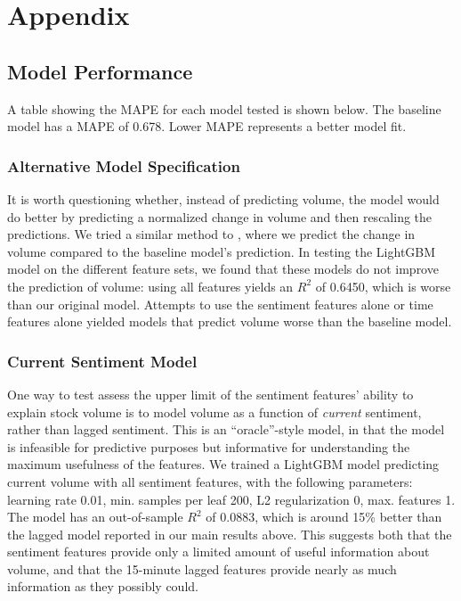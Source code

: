 \documentclass[12pt]{article}
\begin{document}
\newpage
\printbibliography
\newpage

\section{Appendix}
\subsection{Model Performance}
\label{section:appendix_model_performance}
A table showing the MAPE for each model tested is shown below. The baseline model has a MAPE of 0.678. Lower MAPE represents a better model fit.


\subsubsection{Alternative Model Specification}
It is worth questioning whether, instead of predicting volume, the model would do better by predicting a normalized change in volume and then rescaling the predictions. We tried a similar method to \textcite{goyenko2024trading}, where we predict the change in volume compared to the baseline model's prediction. In testing the LightGBM model on the different feature sets, we found that these models do not improve the prediction of volume: using all features yields an $R^2$ of 0.6450, which is worse than our original model. Attempts to use the sentiment features alone or time features alone yielded models that predict volume worse than the baseline model.

\subsubsection{Current Sentiment Model}
\label{section:appendix_sentiment}
One way to test assess the upper limit of the sentiment features' ability to explain stock volume is to model volume as a function of \textit{current} sentiment, rather than lagged sentiment. This is an ``oracle''-style model, in that the model is infeasible for predictive purposes but informative for understanding the maximum usefulness of the features. We trained a LightGBM model predicting current volume with all sentiment features, with the following parameters: learning rate 0.01, min. samples per leaf 200, L2 regularization 0, max. features 1. The model has an out-of-sample $R^2$ of 0.0883, which is around 15\% better than the lagged model reported in our main results above. This suggests both that the sentiment features provide only a limited amount of useful information about volume, and that the 15-minute lagged features provide nearly as much information as they possibly could.
\end{document}
